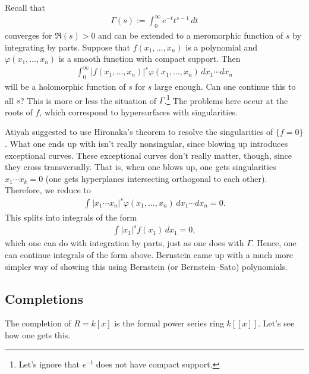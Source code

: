 \documentclass [11 pt, oneside, margin = 1 in] {article}
\begin{document}
\begin{example}\label{}\text{}
Recall that
\begin{align*}
	\Gamma(s) :=  \int_{0}^{\infty} e^{-t}t^{s-1}  \, dt
\end{align*}
	converges for $\Re (s)>0$ and can be extended to a meromorphic function of $s$ by integrating by parts. Suppose that $f(x_1,\hdots,x_n)$ is a polynomial and $\varphi(x_1,\hdots, x_n)$ is a smooth function with compact support. Then
	\begin{align*}
		\int_{0}^{\infty} \left\lvert f(x_1,\hdots, x_n) \right\rvert ^s\varphi(x_1,\hdots,x_n)  \, dx_1\cdots dx_n 
	\end{align*}
	will be a holomorphic function of $s$ for $s$ large enough. Can one continue this to all $s$? This is more or less the situation of $\Gamma$.\footnote{Let's ignore that $e^{-t}$ does not have compact support.} The problems here occur at the roots of $f$, which correspond to hypersurfaces with singularities.
	
	Atiyah suggested to use Hironaka's theorem to resolve the singularities of $\{f=0\}$. What one ends up with isn't really nonsingular, since blowing up introduces exceptional curves. These exceptional curves don't really matter, though, since they cross transversally. That is, when one blows up, one gets singularities $x_1\cdots x_k=0$ (one gets hyperplanes intersecting orthogonal to each other). Therefore, we reduce to 
	\begin{align*}
		\int_{}^{}  \left\lvert x_1\cdots x_n \right\rvert^s\varphi(x_1,\hdots,x_n)   \, dx_1\cdots dx_n =0.
	\end{align*}
	This splits into integrals of the form
	\begin{align*}
		\int\left\lvert x_1 \right\rvert ^sf(x_1)\, dx_1=0,
	\end{align*}
	which one can do with integration by parts, just as one does with $\Gamma$. Hence, one can continue integrals of the form above. Bernstein came up with a much more simpler way of showing this using Bernstein (or Bernstein--Sato) polynomials.
\end{example}

\subsection{Completions}
The completion of $R=k[x]$ is the formal power series ring $k[\![x]\!]$. Let's see how one gets this.
\end{document}
